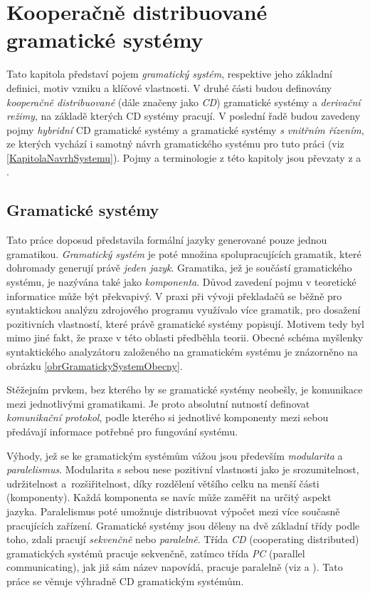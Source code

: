 \chapter{Kooperačně distribuované gramatické systémy} \label{kapitola:GramatickeSystemy}

Tato kapitola představí pojem \emph{gramatický systém}, respektive jeho základní definici, motiv vzniku a klíčové vlastnosti. V druhé části budou definovány \emph{kooperačně distribuované} (dále značeny jako \emph{CD}) gramatické systémy a \emph{derivační režimy}, na základě kterých
CD  systémy pracují. V poslední řadě budou zavedeny pojmy \emph{hybridní} CD gramatické systémy a gramatické systémy \emph{s vnitřním řízením}, ze kterých vychází i samotný návrh gramatického systému pro tuto práci (viz \ref{KapitolaNavrhSystemu}).
Pojmy a terminologie z této kapitoly jsou převzaty z \cite{TID:2007} a \cite{Salomaa:2013:Handbook2}.

\section{Gramatické systémy}
Tato práce doposud představila formální jazyky generované pouze jednou gramatikou. \emph{Gramatický systém} je poté množina spolupracujících gramatik, které
dohromady generují právě \emph{jeden jazyk}. Gramatika, jež je součástí gramatického systému, je nazývána také jako \emph{komponenta}. Důvod zavedení pojmu  v teoretické informatice může být překvapivý. V praxi při vývoji překladačů
se běžně pro syntaktickou analýzu zdrojového programu využívalo více gramatik, pro dosažení pozitivních vlastností, které právě gramatické systémy popisují. Motivem
tedy byl mimo jiné fakt, že praxe v této oblasti předběhla teorii. Obecné schéma myšlenky syntaktického analyzátoru založeného na gramatickém systému je znázorněno na obrázku \ref{obrGramatickySystemObecny}.

Stěžejním prvkem, bez kterého by se gramatické systémy neobešly, je komunikace mezi jednotlivými gramatikami. Je proto absolutní nutností definovat \emph{komunikační protokol},
podle kterého si jednotlivé komponenty mezi sebou předávají informace potřebné pro fungování systému.

Výhody, jež se ke gramatickým systémům vážou jsou především \emph{modularita} a \emph{paralelismus}. Modularita s sebou nese pozitivní vlastnosti jako je
srozumitelnost, udržitelnost a~rozšiřitelnost, díky rozdělení většího celku na menší části (komponenty). Každá komponenta se navíc může zaměřit na určitý aspekt jazyka.
Paralelismus poté umožnuje distribuovat výpočet mezi více současně pracujících zařízení. Gramatické systémy jsou děleny na dvě základní třídy podle toho,
zdali pracují \emph{sekvenčně} nebo \emph{paralelně}. Třída \emph{CD} (cooperating distributed) gramatických systémů pracuje sekvenčně, zatímco třída
\emph{PC} (parallel communicating), jak již sám název napovídá, pracuje paralelně (viz \cite{Salomaa:2013:Handbook2} a \cite{TID:2007}). Tato práce se věnuje výhradně CD gramatickým systémům.

